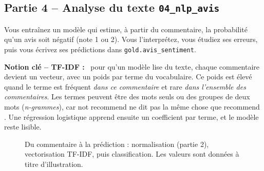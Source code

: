 \documentclass[11pt,a4paper]{article}
\newcommand{\cmd}[1]{\texttt{#1}}
\newenvironment{notion}[1][]{\par\medskip\noindent\textbf{\textcolor{lhblue}{Notion clé\if\relax\detokenize{#1}\relax\else{} -- #1\fi{} :}}\ }{\par\medskip}
\newcommand{\nb}[1]{\textcolor{lhblue}{\texttt{#1}}}
\begin{document}
\subsection*{Partie 4 -- Analyse du texte \hfill \nb{04\_nlp\_avis}}

Vous entraînez un modèle qui estime, à partir du commentaire, la probabilité qu'un avis soit
négatif (note 1 ou 2). Vous l'interprétez, vous étudiez ses erreurs, puis vous écrivez ses
prédictions dans \cmd{gold.avis\_sentiment}.

\begin{notion}[TF-IDF]
pour qu'un modèle lise du texte, chaque commentaire devient un vecteur, avec un poids
par terme du vocabulaire. Ce poids est élevé quand le terme est fréquent \emph{dans ce commentaire}
et rare \emph{dans l'ensemble des commentaires}. Les termes peuvent être des mots seuls ou des groupes
de deux mots (\emph{n-grammes}), car \og not recommend \fg{} ne dit pas la même chose que
\og recommend \fg{}. Une régression logistique apprend ensuite un coefficient par terme, et le modèle
reste lisible.
\end{notion}

\begin{figure}[H]
\centering
{}
\caption{Du commentaire à la prédiction : normalisation (partie 2), vectorisation TF-IDF, puis
classification. Les valeurs sont données à titre d'illustration.}
\label{fig:tfidf}
\end{figure}
\end{document}
